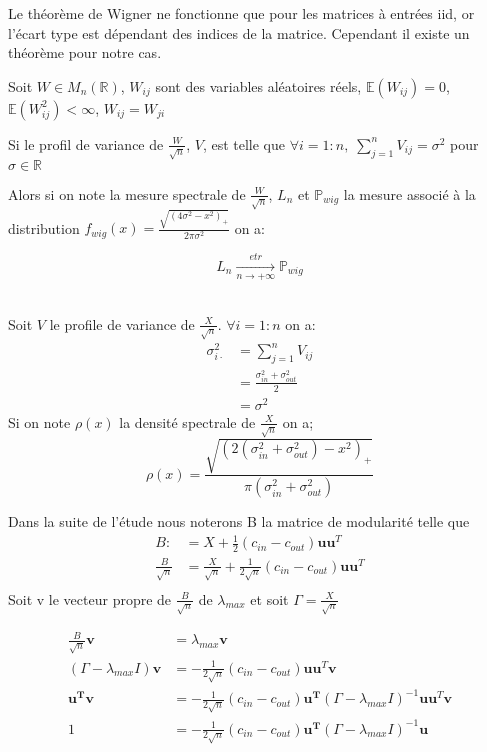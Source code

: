 Le théorème de Wigner ne fonctionne que pour les matrices à entrées iid, or l'écart type est dépendant des indices de la matrice.
Cependant il existe un théorème pour notre cas.
\begin{theorem}
Soit $W \in M_{n}(\mathbb{R})$, $W_{ij}$ sont des variables aléatoires réels, $\mathbb{E}(W_{ij}) = 0$, $\mathbb{E}(W_{ij}^2) < \infty$, $W_{ij} = W_{ji}$

Si le profil de variance de $\frac{W}{\sqrt{n}}$, $V$, est telle que $\forall i = 1:n , \; \sum_{j=1}^{n}V_{ij} = \sigma^2$ pour $\sigma \in \mathbb{R}$

Alors si on note la mesure spectrale de $\frac{W}{\sqrt{n}}$, $L_{n}$  et $\mathbb{P}_{wig}$ la mesure associé à la distribution $f_{wig}(x)= \frac{\sqrt{(4\sigma^2 - x^2)_+}}{2\pi\sigma^2}$ on a:

\begin{equation}
	L_n\xrightarrow[n \to +\infty]{etr} \mathbb{P}_{wig}\nonumber
\end{equation}\\
\end{theorem}

Soit $V$ le profile de variance de $\frac{X}{\sqrt{n}}$. $\forall i = 1:n$ on a: 
\begin{align*} 
\sigma_{i \cdot}^2 &= \sum_{j=1}^{n}V_{ij}  \\
 		&= \frac{\sigma_{in}^2 + \sigma_{out}^2}{2}  \\
		&=\sigma^2
\end{align*}
Si on note $\rho(x)$ la densité spectrale de $\frac{X}{\sqrt{n}}$ on a;
\begin{equation}
	\rho(x) = \frac{\sqrt{(2(\sigma_{in}^2 + \sigma_{out}^2) - x^2)_+}}{\pi(\sigma_{in}^2 + \sigma_{out}^2)}
\end{equation}

Dans la suite de l'étude nous noterons B la matrice de modularité telle que 
\begin{align*} 
B :&= X + \frac{1}{2}(c_{in} - c_{out})\mathbf{uu}^T \\
\frac{B}{\sqrt{n}} &= \frac{X}{\sqrt{n}} + \frac{1}{2\sqrt{n}}(c_{in} - c_{out})\mathbf{uu}^T\\
\end{align*}
Soit v le vecteur propre de $\frac{B}{\sqrt{n}}$ de $\lambda_{max}$ et soit $\Gamma = \frac{X}{\sqrt{n}}$

\begin{align} 
\frac{B}{\sqrt{n}}\mathbf{v} &= \lambda_{max}\mathbf{v} \nonumber\\
(\Gamma - \lambda_{max}I)\mathbf{v} &= -\frac{1}{2\sqrt{n}}(c_{in} - c_{out})\mathbf{uu}^T \mathbf{v} \nonumber\\
 \mathbf{u^Tv} &= -\frac{1}{2\sqrt{n}}(c_{in} - c_{out})\mathbf{u^T}(\Gamma - \lambda_{max}I)^{-1}\mathbf{uu}^T \mathbf{v} \nonumber\\
 1 &= -\frac{1}{2\sqrt{n}}(c_{in} - c_{out})\mathbf{u^T}(\Gamma - \lambda_{max}I)^{-1}\mathbf{u} \label{eq:3}
\end{align}


